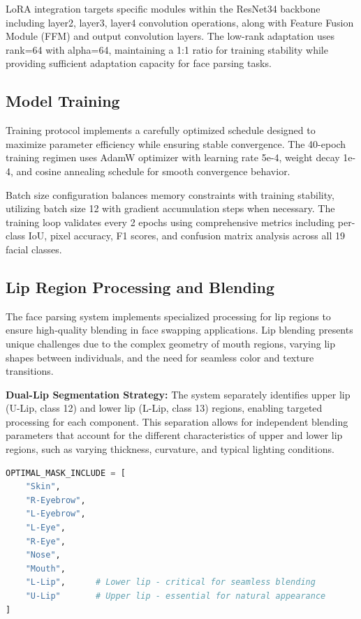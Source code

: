 \documentclass[12pt,a4paper]{report}
\begin{document}
LoRA integration \cite{hu2021lora} targets specific modules within the ResNet34 backbone including layer2, layer3, layer4 convolution operations, along with Feature Fusion Module (FFM) and output convolution layers. The low-rank adaptation uses rank=64 with alpha=64, maintaining a 1:1 ratio for training stability while providing sufficient adaptation capacity for face parsing tasks.

\subsection{Model Training}

Training protocol implements a carefully optimized schedule designed to maximize parameter efficiency while ensuring stable convergence. The 40-epoch training regimen uses AdamW optimizer with learning rate 5e-4, weight decay 1e-4, and cosine annealing schedule for smooth convergence behavior.

Batch size configuration balances memory constraints with training stability, utilizing batch size 12 with gradient accumulation steps when necessary. The training loop validates every 2 epochs using comprehensive metrics including per-class IoU, pixel accuracy, F1 scores, and confusion matrix analysis across all 19 facial classes.

\subsection{Lip Region Processing and Blending}

The face parsing system implements specialized processing for lip regions to ensure high-quality blending in face swapping applications. Lip blending presents unique challenges due to the complex geometry of mouth regions, varying lip shapes between individuals, and the need for seamless color and texture transitions.

\textbf{Dual-Lip Segmentation Strategy:} The system separately identifies upper lip (U-Lip, class 12) and lower lip (L-Lip, class 13) regions, enabling targeted processing for each component. This separation allows for independent blending parameters that account for the different characteristics of upper and lower lip regions, such as varying thickness, curvature, and typical lighting conditions.

\begin{lstlisting}[language=Python, caption={Optimal face parsing settings with emphasis on lip region accuracy}]
OPTIMAL_MASK_INCLUDE = [
    "Skin",
    "R-Eyebrow",
    "L-Eyebrow", 
    "L-Eye",
    "R-Eye",
    "Nose",
    "Mouth",
    "L-Lip",      # Lower lip - critical for seamless blending
    "U-Lip"       # Upper lip - essential for natural appearance
]
\end{lstlisting}
\end{document}
